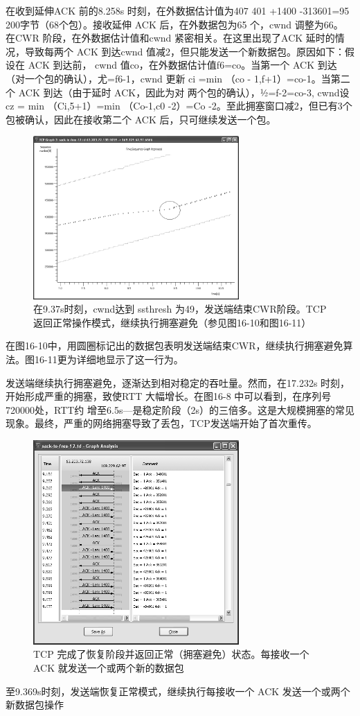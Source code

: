 在收到延伸ACK 前的8.258s 时刻，在外数据估计值为407 401 +1400 -313601=95 200字节（68个包）。接收延伸 ACK 后，在外数据包为65 个，cwnd 调整为66。
在CWR 阶段，在外数据估计值和cwnd 紧密相关。在这里出现了ACK 延时的情况，导致每两个 ACK 到达cwnd 值减2，但只能发送一个新数据包。原因如下：假设在 ACK 到达前，
cwnd 值co，在外数据估计值f6=co。当第一个 ACK 到达（对一个包的确认），尤=f6-1，cwnd 更新 ci =min （co - 1,f+1）=co-1。当第二个 ACK 到达（由于延时 ACK，因此为对
两个包的确认），½=f-2=co-3, cwnd设 cz = min （Ci,5+1）=min （Co-1,c0 -2）=Co -2。至此拥塞窗口减2，但已有3个包被确认，因此在接收第二个 ACK 后，只可继续发送一个包。
\begin{figure}[!htb]
    \centering
	\includegraphics[width=0.7\textwidth]{imgs/16/16-10.png}
	\caption{在9.37s时刻，cwnd达到 ssthresh 为49，发送端结束CWR阶段。TCP 返回正常操作模式，继续执行拥塞避免（参见图16-10和图16-11）}
\end{figure}

在图16-10中，用圆圈标记出的数据包表明发送端结束CWR，继续执行拥塞避免算法。图16-11更为详细地显示了这一行为。

发送端继续执行拥塞避免，逐渐达到相对稳定的吞吐量。然而，在17.232s 时刻，开始形成严重的拥塞，致使RTT 大幅增长。在图16-8 中可以看到，在序列号 720000处，RTT约
增至6.5s—是稳定阶段（2s）的三倍多。这是大规模拥塞的常见现象。最终，严重的网络拥塞导致了丢包，TCP发送端开始了首次重传。
\begin{figure}[!htb]
    \centering
	\includegraphics[width=0.7\textwidth]{imgs/16/16-11.png}
	\caption{TCP 完成了恢复阶段并返回正常（拥塞避免）状态。每接收一个 ACK 就发送一个或两个新的数据包}
\end{figure}
至9.369s时刻，发送端恢复正常模式，继续执行每接收一个 ACK 发送一个或两个新数据包操作

